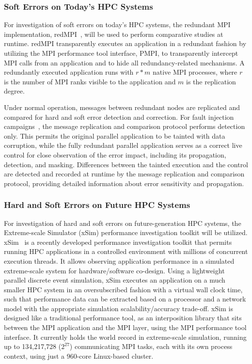 \subsubsection{Soft Errors on Today's HPC Systems}

For investigation of soft errors on today's HPC systems, the redundant MPI
implementation, redMPI~\cite{fiala12detection2, elliott12combining,
  boehm12file, engelmann11redundant, engelmann09case}, will be used to perform
comparative studies at runtime. redMPI transparently executes an application
in a redundant fashion by utilizing the MPI performance tool interface, PMPI,
to transparently intercept MPI calls from an application and to hide all
redundancy-related mechanisms. A redundantly executed application runs with
$r*m$ native MPI processes, where $r$ is the number of MPI ranks visible to
the application and $m$ is the replication degree.

Under normal operation, messages between redundant nodes are replicated and
compared for hard and soft error detection and correction. For fault injection
campaigns~\cite{fiala12detection2}, the message replication and comparison
protocol performs detection only. This permits the original parallel
application to be tainted with data corruption, while the fully redundant
parallel application serves as a correct live control for close observation of
the error impact, including its propagation, detection, and
masking. Differences between the tainted execution and the control are
detected and recorded at runtime by the message replication and comparison
protocol, providing detailed information about error sensitivity and
propagation.

\subsubsection{Hard and Soft Errors on Future HPC Systems}
\label{sec:hard-soft-errors}

For investigation of hard and soft errors on future-generation HPC systems,
the Extreme-scale Simulator (xSim) performance investigation toolkit will be
utilized. xSim~\cite{boehm11xsim, engelmann10facilitating, jones11simulation}
is a recently developed performance investigation toolkit that permits running
HPC applications in a controlled environment with millions of concurrent
execution threads. It allows observing application performance in a simulated
extreme-scale system for hardware/software co-design. Using a lightweight
parallel discrete event simulation, xSim executes an application on a much
smaller HPC system in an oversubscribed fashion with a virtual wall clock
time, such that performance data can be extracted based on a processor and a
network model with the appropriate simulation scalability/accuracy
trade-off. xSim is designed like a traditional performance tool, as an
interposition library that sits between the MPI application and the MPI layer,
using the MPI performance tool interface. It currently holds the world record
in extreme-scale simulation, running up to 134,217,728 ($2^{27}$)
communicating MPI tasks, each with its own process context, using just a
960-core Linux-based cluster.

